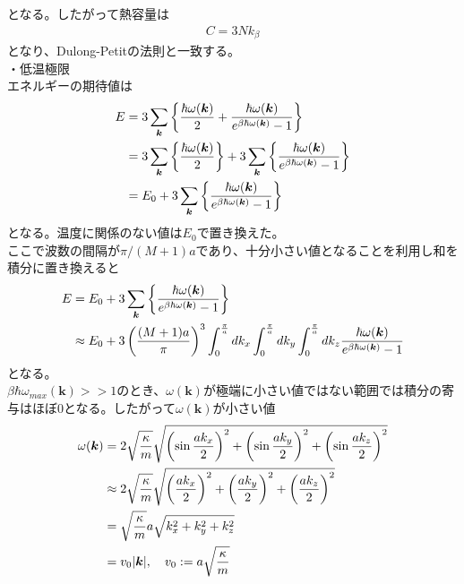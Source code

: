 \documentclass{jsarticle}  %
\numberwithin{equation}{section} %
\numberwithin{figure}{section}
\begin{document}
    となる。したがって熱容量は
    \begin{align}
        C = 3Nk_\beta 
    \end{align}
    となり、Dulong-Petitの法則と一致する。\\
    ・低温極限\\
    エネルギーの期待値は
    \begin{align}
        E &= 3 \sum_{\bm{k}} \left\{ \frac{\hbar \omega (\bm{k})}{2}  +\frac{\hbar \omega (\bm{k})}{ e^{\beta \hbar \omega (\bm{k})} - 1} \right\} \notag \\ 
        &= 3 \sum_{\bm{k}} \left\{ \frac{\hbar \omega (\bm{k})}{2}  \right\} + 3 \sum_{\bm{k}} \left\{ \frac{\hbar \omega (\bm{k})}{ e^{\beta \hbar \omega (\bm{k})} - 1} \right\} \notag \\ 
        &= E_0 + 3 \sum_{\bm{k}} \left\{ \frac{\hbar \omega (\bm{k})}{ e^{\beta \hbar \omega (\bm{k})} - 1} \right\} \notag 
    \end{align}
    となる。温度に関係のない値は$E_0$で置き換えた。\\
    ここで波数の間隔が$\pi / (M+1)a$であり、十分小さい値となることを利用し和を積分に置き換えると
    \begin{align}
        E &= E_0 + 3 \sum_{\bm{k}} \left\{ \frac{\hbar \omega (\bm{k})}{ e^{\beta \hbar \omega (\bm{k})} - 1} \right\} \notag  \notag \\
        &\approx E_0 + 3\left( \frac{(M+1)a}{\pi} \right)^3 \int_0^{\frac{\pi}{a}} dk_x \int_0^{\frac{\pi}{a}} dk_y \int_0^{\frac{\pi}{a}} dk_z \frac{\hbar \omega (\bm{k})}{ e^{\beta \hbar \omega (\bm{k})} - 1}  
    \end{align}
    となる。\\
    $\beta \hbar \omega_{max}(\bm{k}) >> 1$のとき、$\omega (\bm{k})$が極端に小さい値ではない範囲では積分の寄与はほぼ0となる。したがって$\omega (\bm{k})$が小さい値
    \begin{align}
        \omega (\bm{k}) &= 2 \sqrt{\frac{\kappa}{m}} \sqrt{\left( \sin \frac{ak_x}{2} \right)^2 + \left( \sin \frac{ak_y}{2} \right)^2 + \left( \sin \frac{ak_z}{2} \right)^2} \notag \\
        &\approx 2 \sqrt{\frac{\kappa}{m}} \sqrt{\left( \frac{ak_x}{2} \right)^2 + \left( \frac{ak_y}{2} \right)^2 + \left( \frac{ak_z}{2} \right)^2} \notag \\
        &= \sqrt{\frac{\kappa}{m}} a \sqrt{ k_x^2 + k_y^2 + k_z^2} \notag \\
        &= v_0 |\bm{k}| , \quad v_0 := a\sqrt{\frac{\kappa}{m}} 
    \end{align}
\end{document}
